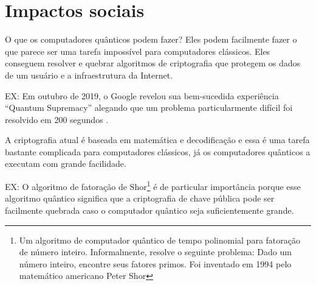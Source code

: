 \section{Impactos sociais}
\label{social_impacts}
O que os computadores quânticos podem fazer?  Eles podem facilmente fazer o que parece ser uma tarefa impossível para computadores clássicos. Eles conseguem resolver e quebrar algoritmos de criptografia que protegem os dados de um usuário e a infraestrutura da Internet.  

EX: Em outubro de 2019, o Google revelou sua bem-sucedida experiência ``Quantum Supremacy'' alegando que um problema particularmente difícil foi resolvido em 200 segundos \cite{15}.

A criptografia atual é baseada em matemática e decodificação e essa é uma tarefa bastante complicada para computadores clássicos, já os computadores quânticos a executam com grande facilidade. 

EX: O algoritmo de fatoração de Shor\footnote{Um algoritmo de computador quântico de tempo polinomial para fatoração de número inteiro. Informalmente, resolve o seguinte problema: Dado um número inteiro, encontre seus fatores primos. Foi inventado em 1994 pelo matemático americano Peter Shor} é de particular importância porque esse algoritmo quântico significa que a criptografia de chave pública pode ser facilmente quebrada caso o computador quântico seja suficientemente grande.
\newpage